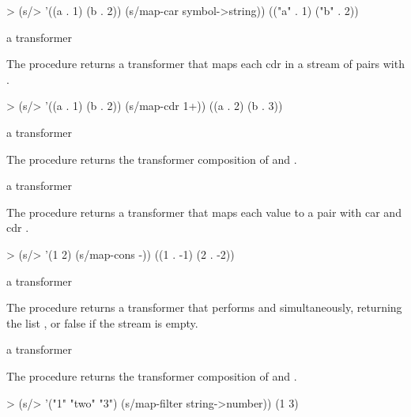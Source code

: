 \codebegin
> (s/> '((a . 1) (b . 2)) (s/map-car symbol->string))
(("a" . 1) ("b" . 2))
\codeend

\begin{procedure}
\end{procedure}
\returns{} a transformer

The  procedure returns a transformer that maps each cdr in a
stream of pairs with .

\codebegin
> (s/> '((a . 1) (b . 2)) (s/map-cdr 1+))
((a . 2) (b . 3))
\codeend

\begin{procedure}
\end{procedure}
\returns{} a transformer

The  procedure returns the transformer composition of  and .

\begin{procedure}
\end{procedure}
\returns{} a transformer

The  procedure returns a transformer that maps each value
 to a pair with car  and cdr .

\codebegin
> (s/> '(1 2) (s/map-cons -))
((1 . -1) (2 . -2))
\codeend

\begin{procedure}
\end{procedure}
\returns{} a transformer

The  procedure returns a transformer that performs 
and  simultaneously, returning the list , or
false if the stream is empty.

\begin{procedure}
\end{procedure}
\returns{} a transformer

The  procedure returns the transformer composition of  and .

\codebegin
> (s/> '("1" "two" "3") (s/map-filter string->number))
(1 3)
\codeend

